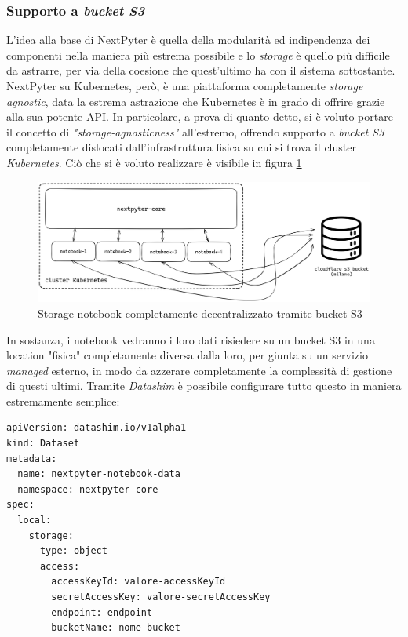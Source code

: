 \subsubsection{Supporto a \textit{bucket S3}}
L'idea alla base di NextPyter è quella della modularità ed indipendenza dei componenti nella maniera più estrema possibile e lo \textit{storage} è quello più difficile da astrarre, per via della coesione che quest'ultimo ha con il sistema sottostante.
\newline
NextPyter su Kubernetes, però, è una piattaforma completamente \textit{storage agnostic}, data la estrema astrazione che Kubernetes è in grado di offrire grazie alla sua potente API. In particolare, a prova di quanto detto, si è voluto portare il concetto di \textit{"storage-agnosticness"} all'estremo, offrendo supporto a \textit{bucket S3} completamente dislocati dall'infrastruttura fisica su cui si trova il cluster \textit{Kubernetes}.
\newline
Ciò che si è voluto realizzare è visibile in figura \ref{fig:s3-bucket}
\begin{figure}[h]
    \centering
    \includegraphics[width=1\textwidth]{files/images/s3-bucket.png}
    \caption{Storage notebook completamente decentralizzato tramite bucket S3}
    \label{fig:s3-bucket}
\end{figure}
In sostanza, i notebook vedranno i loro dati risiedere su un bucket S3 in una location "fisica" completamente diversa dalla loro, per giunta su un servizio \textit{managed} esterno, in modo da azzerare completamente la complessità di gestione di questi ultimi.
\newline
Tramite \textit{Datashim} è possibile configurare tutto questo in maniera estremamente semplice:
\begin{verbatim}
apiVersion: datashim.io/v1alpha1
kind: Dataset
metadata:
  name: nextpyter-notebook-data
  namespace: nextpyter-core
spec:
  local:
    storage:
      type: object
      access:
        accessKeyId: valore-accessKeyId
        secretAccessKey: valore-secretAccessKey
        endpoint: endpoint
        bucketName: nome-bucket

\end{verbatim}
